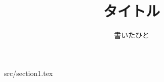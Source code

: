 \documentclass[11pt,a4paper]{jsarticle}
\title {タイトル}
\author {書いたひと}
\begin{document}
\maketitle
\newpage
 {src/section1.tex}
\end{document}
